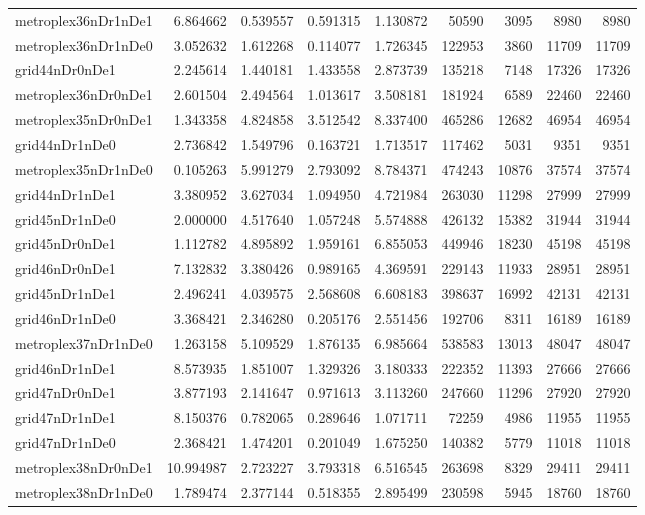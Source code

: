 \begin{longtable}{|l|r|r|r|r|r|r|r|r|}
metroplex36nDr1nDe1 & 6.864662 & 0.539557 & 0.591315 & 1.130872 & 50590 & 3095 & 8980 & 8980 \\
metroplex36nDr1nDe0 & 3.052632 & 1.612268 & 0.114077 & 1.726345 & 122953 & 3860 & 11709 & 11709 \\
grid44nDr0nDe1 & 2.245614 & 1.440181 & 1.433558 & 2.873739 & 135218 & 7148 & 17326 & 17326 \\
metroplex36nDr0nDe1 & 2.601504 & 2.494564 & 1.013617 & 3.508181 & 181924 & 6589 & 22460 & 22460 \\
metroplex35nDr0nDe1 & 1.343358 & 4.824858 & 3.512542 & 8.337400 & 465286 & 12682 & 46954 & 46954 \\
grid44nDr1nDe0 & 2.736842 & 1.549796 & 0.163721 & 1.713517 & 117462 & 5031 & 9351 & 9351 \\
metroplex35nDr1nDe0 & 0.105263 & 5.991279 & 2.793092 & 8.784371 & 474243 & 10876 & 37574 & 37574 \\
grid44nDr1nDe1 & 3.380952 & 3.627034 & 1.094950 & 4.721984 & 263030 & 11298 & 27999 & 27999 \\
grid45nDr1nDe0 & 2.000000 & 4.517640 & 1.057248 & 5.574888 & 426132 & 15382 & 31944 & 31944 \\
grid45nDr0nDe1 & 1.112782 & 4.895892 & 1.959161 & 6.855053 & 449946 & 18230 & 45198 & 45198 \\
grid46nDr0nDe1 & 7.132832 & 3.380426 & 0.989165 & 4.369591 & 229143 & 11933 & 28951 & 28951 \\
grid45nDr1nDe1 & 2.496241 & 4.039575 & 2.568608 & 6.608183 & 398637 & 16992 & 42131 & 42131 \\
grid46nDr1nDe0 & 3.368421 & 2.346280 & 0.205176 & 2.551456 & 192706 & 8311 & 16189 & 16189 \\
metroplex37nDr1nDe0 & 1.263158 & 5.109529 & 1.876135 & 6.985664 & 538583 & 13013 & 48047 & 48047 \\
grid46nDr1nDe1 & 8.573935 & 1.851007 & 1.329326 & 3.180333 & 222352 & 11393 & 27666 & 27666 \\
grid47nDr0nDe1 & 3.877193 & 2.141647 & 0.971613 & 3.113260 & 247660 & 11296 & 27920 & 27920 \\
grid47nDr1nDe1 & 8.150376 & 0.782065 & 0.289646 & 1.071711 & 72259 & 4986 & 11955 & 11955 \\
grid47nDr1nDe0 & 2.368421 & 1.474201 & 0.201049 & 1.675250 & 140382 & 5779 & 11018 & 11018 \\
metroplex38nDr0nDe1 & 10.994987 & 2.723227 & 3.793318 & 6.516545 & 263698 & 8329 & 29411 & 29411 \\
metroplex38nDr1nDe0 & 1.789474 & 2.377144 & 0.518355 & 2.895499 & 230598 & 5945 & 18760 & 18760 \\

\end{longtable}
